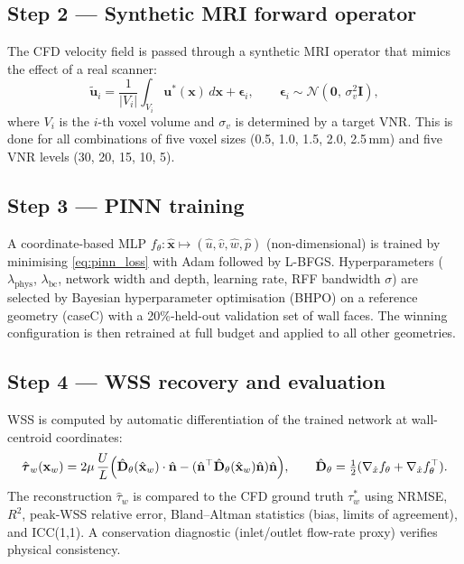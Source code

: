 \documentclass[11pt]{article}
\begin{document}
\subsection*{Step 2 — Synthetic MRI forward operator}
The CFD velocity field is passed through a synthetic MRI operator that mimics the
effect of a real scanner:
\[
    \tilde{\mathbf{u}}_i
    = \frac{1}{|V_i|}\int_{V_i} \mathbf{u}^*(\mathbf{x})\,d\mathbf{x}
      + \boldsymbol{\epsilon}_i, \qquad
    \boldsymbol{\epsilon}_i \sim \mathcal{N}(\mathbf{0},\,\sigma_v^2 \mathbf{I}),
\]
where $V_i$ is the $i$-th voxel volume and $\sigma_v$ is determined by a target VNR.
This is done for all combinations of five voxel sizes
(0.5, 1.0, 1.5, 2.0, 2.5\,mm) and five VNR levels (30, 20, 15, 10, 5).

\subsection*{Step 3 — PINN training}
A coordinate-based MLP $f_\theta: \hat{\mathbf{x}} \mapsto (\hat{u},\hat{v},\hat{w},\hat{p})$
(non-dimensional) is trained by minimising \eqref{eq:pinn_loss} with Adam followed by
L-BFGS.  Hyperparameters ($\lambda_{\text{phys}}$, $\lambda_{\text{bc}}$, network
width and depth, learning rate, RFF bandwidth $\sigma$) are selected by Bayesian
hyperparameter optimisation (BHPO) on a reference geometry (caseC) with a
20\%-held-out validation set of wall faces.  The winning configuration is then retrained
at full budget and applied to all other geometries.

\subsection*{Step 4 — WSS recovery and evaluation}
WSS is computed by automatic differentiation of the trained network at wall-centroid
coordinates:
\[
    \hat{\boldsymbol{\tau}}_w(\mathbf{x}_w)
    = 2\mu\,\frac{U}{L}\Bigl(
        \hat{\mathbf{D}}_\theta(\hat{\mathbf{x}}_w)\cdot\hat{\mathbf{n}}
        - (\hat{\mathbf{n}}^\top\hat{\mathbf{D}}_\theta(\hat{\mathbf{x}}_w)\hat{\mathbf{n}})\hat{\mathbf{n}}
      \Bigr),
    \qquad
    \hat{\mathbf{D}}_\theta = \tfrac{1}{2}(\nabla_{\hat{x}} f_\theta + \nabla_{\hat{x}} f_\theta^\top).
\]
The reconstruction $\hat{\tau}_w$ is compared to the CFD ground truth $\tau_w^*$ using
NRMSE, $R^2$, peak-WSS relative error, Bland--Altman statistics (bias, limits of
agreement), and ICC(1,1).  A conservation diagnostic (inlet/outlet flow-rate proxy)
verifies physical consistency.
\end{document}

